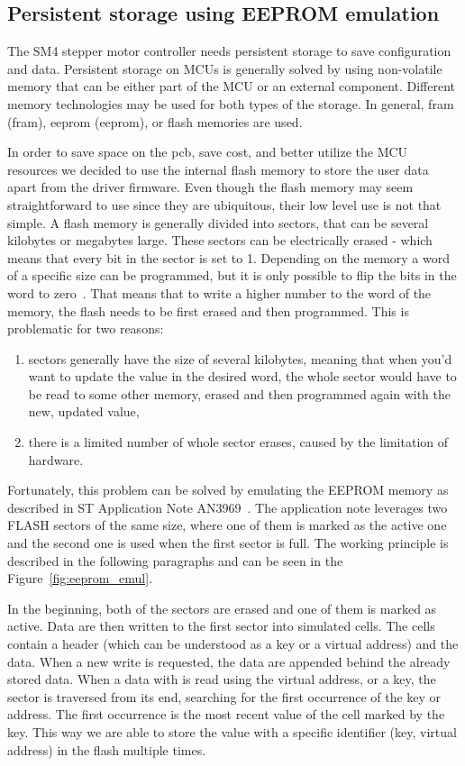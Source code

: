 \subsection{Persistent storage using EEPROM emulation}
\label{subsec:eeprom}
The SM4 stepper motor controller needs persistent storage to save configuration and data.
Persistent storage on MCUs is generally solved by using non-volatile memory that can be either part of the MCU or an external component.
Different memory technologies may be used for both types of the storage.
In general, \acs{fram} (\acl{fram}), \acs{eeprom} (\acl{eeprom}), or flash memories are used.

In order to save space on the \acs{pcb}, save cost, and better utilize the MCU resources we decided to use the internal flash memory to store the user data apart from the driver firmware.
Even though the flash memory may seem straightforward to use since they are ubiquitous, their low level use is not that simple.
A flash memory is generally divided into sectors, that can be several kilobytes or megabytes large.
These sectors can be electrically erased - which means that every bit in the sector is set to 1.
Depending on the memory a word of a specific size can be programmed, but it is only possible to flip the bits in the word to zero~\cite{mansanet_ecorax_nodate, mansanet_ecorax_nodate-1}.
That means that to write a higher number to the word of the memory, the flash needs to be first erased and then programmed.
This is problematic for two reasons:
\begin{enumerate}
    \item sectors generally have the size of several kilobytes, meaning that when you'd want to update the value in the desired word, the whole sector would have to be read to some other memory, erased and then programmed again with the new, updated value,
    \item there is a limited number of whole sector erases, caused by the limitation of hardware.
\end{enumerate}

Fortunately, this problem can be solved by emulating the EEPROM memory as described in ST Application Note AN3969~\cite{stmicro_an3969_2011}.
The application note leverages two FLASH sectors of the same size, where one of them is marked as the active one and the second one is used when the first sector is full.
The working principle is described in the following paragraphs and can be seen in the Figure~\ref{fig:eeprom_emul}.

In the beginning, both of the sectors are erased and one of them is marked as active.
Data are then written to the first sector into simulated cells.
The cells contain a header (which can be understood as a key or a virtual address) and the data.
When a new write is requested, the data are appended behind the already stored data.
When a data with is read using the virtual address, or a key, the sector is traversed from its end, searching for the first occurrence of the key or address.
The first occurrence is the most recent value of the cell marked by the key.
This way we are able to store the value with a specific identifier (key, virtual address) in the flash multiple times.

